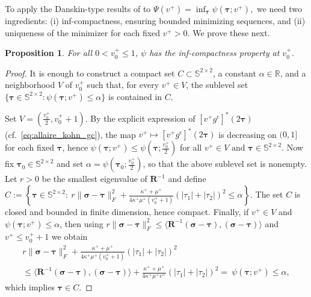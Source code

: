 \documentclass[preprint,3p]{elsarticle}
\newcommand{\tenss}[1]{\bm{\mathbf{#1}}}            %
\newcommand{\tensf}[1]{\bm{\mathbf{#1}}}            %
\newcommand{\stress}{\tenss{\sigma}}                %
\newtheorem{proposition}{Proposition}[section]
\begin{document}
To apply the Danskin-type results of \citet{bonnans2013perturbation} to
$
\Psi(v^+)=\inf_{\tenss{\tau}}\psi(\tenss{\tau};v^+),
$
we need two ingredients: (i) inf-compactness, ensuring bounded minimizing sequences, and (ii) uniqueness of the minimizer for each fixed $v^+>0$. We prove these next.
%
 \begin{proposition}
     For all $0<v^+_0\leq 1$, $\psi$ has the inf-compactness property at $v^+_0$.
 \end{proposition}
 \begin{proof}
     It is enough to construct a compact set $C\subset \mathbb{S}^{2\times 2}$, a constant $\alpha\in \mathbb{R}$, and a neighborhood $V$ of $v^+_0$ such that, for every $v^+\in V$, the sublevel set $\{\tenss{\tau}\in\mathbb{S}^{2\times 2}:\psi(\tenss{\tau};v^+)\leq \alpha\}$ is contained in $C$.

	     Set $V=(\frac{v^+_0}{2},v^+_0+1)$. By the explicit expression of $[v^+g^\mathrm{c}]^*(2\tenss{\tau})$ (cf.\ \eqref{eq:allaire_kohn_gc}), the map $v^+\mapsto [v^+g^\mathrm{c}]^*(2\tenss{\tau})$ is decreasing on $(0,1]$ for each fixed $\tenss{\tau}$, hence
	     $
	         \psi(\tenss{\tau};v^+)\leq \psi\left(\tenss{\tau};\tfrac{v^+_0}{2}\right)$
          for all $v^+\in V \text{ and } \tenss{\tau}\in\mathbb{S}^{2\times 2}.
     $
     Now fix $\tenss{\tau}_0\in\mathbb{S}^{2\times 2}$ and set $\alpha=\psi\left(\tenss{\tau}_0;\frac{v^+_0}{2}\right)$, so that the above sublevel set is nonempty. Let $r>0$ be the smallest eigenvalue of $\tensf{R}^{-1}$ and define
     $
         C:=\left\{\tenss{\tau}\in\mathbb{S}^{2\times 2}:\ r\lVert\stress-\tenss{\tau}\rVert_F^2+\frac{\kappa^++\mu^+}{4\kappa^+\mu^+(v^+_0+1)}\left(\lvert\tau_1\rvert+\lvert\tau_2\rvert\right)^2\leq \alpha\right\}.
     $
     The set $C$ is closed and bounded in finite dimension, hence compact. Finally, if $v^+\in V$ and $\psi(\tenss{\tau};v^+)\leq \alpha$, then using $r\lVert\stress-\tenss{\tau}\rVert_F^2\leq \langle \tensf{R}^{-1}(\stress-\tenss{\tau}),(\stress-\tenss{\tau})\rangle$ and $v^+\leq v^+_0+1$ we obtain
     \begin{multline}
         r\lVert\stress-\tenss{\tau}\rVert_F^2+\frac{\kappa^++\mu^+}{4\kappa^+\mu^+(v^+_0+1)}\left(\lvert\tau_1\rvert+\lvert\tau_2\rvert\right)^2
         \\ \leq \langle \tensf{R}^{-1}(\stress-\tenss{\tau}),(\stress-\tenss{\tau})\rangle+\frac{\kappa^++\mu^+}{4\kappa^+\mu^+v^+}\left(\lvert\tau_1\rvert+\lvert\tau_2\rvert\right)^2
         =\ \psi(\tenss{\tau};v^+)\leq \alpha,
     \end{multline}
     which implies $\tenss{\tau}\in C$.
 \end{proof}
\end{document}
